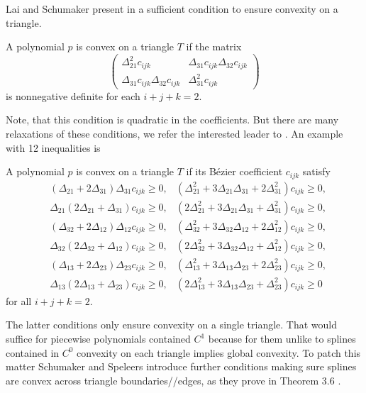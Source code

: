 Lai and Schumaker present in \cite{LS2007}  a sufficient condition to ensure convexity on a triangle.
\begin{theorem}
	A polynomial $p$ is convex on a triangle $T$ if the matrix
	\[
		\begin{pmatrix}
			\Delta_{21}^2 c_{ijk} & \Delta_{31} c_{ijk} \Delta_{32} c_{ijk}\\
			\Delta_{31}c_{ijk} \Delta_{32} c_{ijk} & \Delta_{31}^2 c_{ijk} 
		\end{pmatrix}
	\]
	is nonnegative definite for each $i + j + k =2 $.
\end{theorem}
Note, that this condition is quadratic in the coefficients. But there are many relaxations of these conditions, we refer the interested leader to \cite{SS2010}. An example with 12 inequalities is 
\begin{theorem}
	A polynomial $p$ is convex on a triangle $T$ if its B\'ezier coefficient $c_{ijk}$ satisfy
	\begin{align*}
		&(\Delta_{21} + 2\Delta_{31}) \Delta_{31} c_{ijk} \geq 0, 
		&   (\Delta_{21}^2 + 3\Delta_{21} \Delta_{31} + 2 \Delta_{31}^2) c_{ijk} \geq 0, \\
		& \Delta_{21}(2\Delta_{21} + \Delta_{31})  c_{ijk} \geq 0, 
		&   (2\Delta_{21}^2 + 3\Delta_{21} \Delta_{31} +  \Delta_{31}^2) c_{ijk} \geq 0, \\  
		&(\Delta_{32} + 2\Delta_{12}) \Delta_{12} c_{ijk} \geq 0, 
		&   (\Delta_{32}^2 + 3\Delta_{32} \Delta_{12} + 2 \Delta_{12}^2) c_{ijk} \geq 0, \\
		&\Delta_{32} (2\Delta_{32} + \Delta_{12}) c_{ijk} \geq 0, 
		&   (2\Delta_{32}^2 + 3\Delta_{32} \Delta_{12} +  \Delta_{12}^2) c_{ijk} \geq 0, \\  
		&(\Delta_{13} + 2\Delta_{23}) \Delta_{23} c_{ijk} \geq 0, 
		&   (\Delta_{13}^2 + 3\Delta_{13} \Delta_{23} + 2 \Delta_{23}^2) c_{ijk} \geq 0, \\
		& \Delta_{13}(2\Delta_{13} + \Delta_{23})  c_{ijk} \geq 0, 
		&   (2\Delta_{13}^2 + 3\Delta_{13} \Delta_{23} +  \Delta_{23}^2) c_{ijk} \geq 0   
	\end{align*}
	for all $i + j + k =2 $.
\end{theorem}
The latter conditions only ensure convexity on a single triangle. That would suffice for piecewise polynomials contained $C^1$ because for them unlike to splines contained in $C^0$ convexity on each triangle implies global convexity. To patch this matter Schumaker and Speleers introduce further conditions making sure splines are convex across triangle boundaries//edges, as they prove in Theorem 3.6 \cite{SS2014}.
